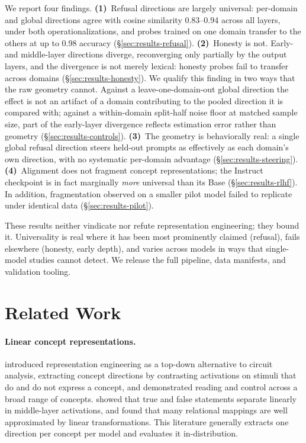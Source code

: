 \documentclass[11pt]{article}
\begin{document}
We report four findings. \textbf{(1)}~Refusal directions are largely
universal: per-domain and global directions agree with cosine similarity
0.83--0.94 across all layers, under both operationalizations, and probes
trained on one domain transfer to the others at up to 0.98 accuracy
(\S\ref{sec:results-refusal}). \textbf{(2)}~Honesty is not. Early- and
middle-layer directions diverge, reconverging only partially
by the output layers, and the divergence is not merely lexical: honesty
probes fail to transfer across domains (\S\ref{sec:results-honesty}). We
qualify this finding in two ways that the raw geometry cannot. Against a
leave-one-domain-out global direction the effect is not an artifact of a
domain contributing to the pooled direction it is compared with; against a
within-domain split-half noise floor at matched sample size, part of the
early-layer divergence reflects estimation error rather than geometry
(\S\ref{sec:results-controls}). \textbf{(3)}~The
geometry is behaviorally real: a single global refusal direction steers
held-out prompts as effectively as each domain's own direction, with no
systematic per-domain advantage (\S\ref{sec:results-steering}). \textbf{(4)}~Alignment does not
fragment concept representations; the Instruct checkpoint is in fact
marginally \emph{more} universal than its Base (\S\ref{sec:results-rlhf}).
In addition, fragmentation observed on a smaller pilot model failed to
replicate under identical data (\S\ref{sec:results-pilot}).

These results neither vindicate nor refute representation engineering; they
bound it. Universality is real where it has been most prominently claimed
(refusal), fails elsewhere (honesty, early depth), and varies across models
in ways that single-model studies cannot detect. We release the full
pipeline, data manifests, and validation tooling.


\section{Related Work}
\label{sec:related}

\paragraph{Linear concept representations.}
\citet{zou2023representation} introduced representation engineering as a
top-down alternative to circuit analysis, extracting concept directions by
contrasting activations on stimuli that do and do not express a concept, and
demonstrated reading and control across a broad range of concepts.
\citet{marks2023geometry} showed that true and false statements separate
linearly in middle-layer activations, and \citet{hernandez2023linearity}
found that many relational mappings are well approximated by linear
transformations. This literature generally extracts one direction per
concept per model and evaluates it in-distribution.
\end{document}
